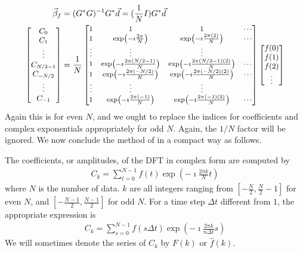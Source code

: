 \begin{align*}
\vec{\beta}_f &= (G^*G)^{-1}G^*\vec{d} = (\frac{1}{N}I)G^*\vec{d} \\
\small
\begin{bmatrix}
C_0 \\
C_1 \\
\vdots \\
C_{N/2-1} \\
C_{-N/2} \\
\vdots \\
C_{-1}
\end{bmatrix}
&= 
\frac{1}{N}
\footnotesize
\begin{bmatrix}
1 & 1 & 1 & \cdots \\
1 & \exp(-\imath\frac{2\pi}{N}) & \exp(-\imath\frac{2\pi(2)}{N}) & \cdots \\
\vdots & \vdots & \vdots & \\
1 & \exp(-\imath\frac{2\pi(N/2-1)}{N}) & \exp(-\imath\frac{2\pi(N/2-1)(2)}{N}) & \cdots \\
1 & \exp(-\imath\frac{2\pi(-N/2)}{N}) & \exp(-\imath\frac{2\pi(-N/2)(2)}{N}) & \cdots \\
\vdots & \vdots & \vdots & \\
1 & \exp(-\imath\frac{2\pi(-1)}{N}) & \exp(-\imath\frac{2\pi(-1)(2)}{N}) & \cdots
\end{bmatrix}
\small
\begin{bmatrix}
f(0) \\
f(1) \\
f(2) \\
\vdots
\end{bmatrix}
\end{align*}
Again this is for even $N$, and we ought to replace the indices for coefficients and complex exponentials appropriately for odd $N$. Again, the $1/N$ factor will be ignored. We now conclude the method of  in a compact way as follows.
\begin{defn}
\label{defn:complexDFT}
The coefficients, or amplitudes, of the DFT in complex form are computed by
\begin{align*}
C_k = \sum_{t=0}^{N-1} f(t)\exp(-\imath\frac{2\pi k}{N}t)
\end{align*}
where $N$ is the number of data. $k$ are all integers ranging from $[-\frac{N}{2}, \frac{N}{2}-1]$ for even $N$, and $[-\frac{N-1}{2}, \frac{N-1}{2}]$ for odd $N$. For a time step $\Delta t$ different from $1$, the appropriate expression is
\begin{align*}
C_k = \sum_{s=0}^{N-1} f(s\Delta t)\exp(-\imath\frac{2\pi k}{n\Delta t}s)
\end{align*}
We will sometimes denote the series of $C_k$ by $F(k)$ or $\hat{f}(k)$.
\end{defn}
